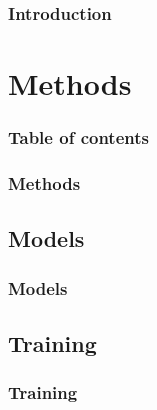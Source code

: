 \documentclass{beamer}
\begin{document}

\begin{frame}
\frametitle{Introduction}

\end{frame}


\section{Methods} %

\begin{frame}
\frametitle{Table of contents} %
\tableofcontents[	currentsection,
	currentsubsection, 
	hideothersubsections, 
	sectionstyle=show/shaded, ] %
\end{frame}


\begin{frame}
\frametitle{Methods}

\end{frame}

\subsection{Models}
\begin{frame}
\frametitle{Models}

\end{frame}

\subsection{Training}
\begin{frame}
\frametitle{Training}

\end{frame}
\end{document}
